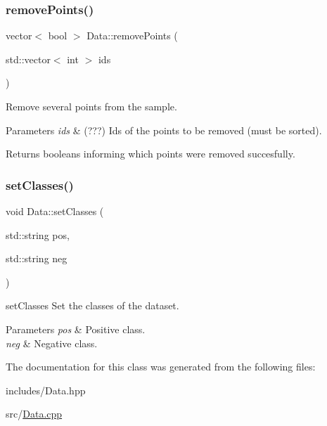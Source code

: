 \subsubsection{\texorpdfstring{remove\+Points()}{removePoints()}}
{\footnotesize\ttfamily vector$<$ bool $>$ Data\+::remove\+Points (\begin{DoxyParamCaption}\item[{std\+::vector$<$ int $>$}]{ids }\end{DoxyParamCaption})}



Remove several points from the sample. 


\begin{DoxyParams}{Parameters}
{\em ids} & (???) Ids of the points to be removed (must be sorted). \\
\hline
\end{DoxyParams}
\begin{DoxyReturn}{Returns}
booleans informing which points were removed succesfully. 
\end{DoxyReturn}
\mbox{\label{class_data_a6dd8a8a1e1659c76e5716fc8a23a86e2}} 
\subsubsection{\texorpdfstring{set\+Classes()}{setClasses()}}
{\footnotesize\ttfamily void Data\+::set\+Classes (\begin{DoxyParamCaption}\item[{std\+::string}]{pos,  }\item[{std\+::string}]{neg }\end{DoxyParamCaption})}



set\+Classes Set the classes of the dataset. 


\begin{DoxyParams}{Parameters}
{\em pos} & Positive class. \\
\hline
{\em neg} & Negative class. \\
\hline
\end{DoxyParams}


The documentation for this class was generated from the following files\+:\begin{DoxyCompactItemize}
\item 
includes/Data.\+hpp\item 
src/\hyperlink{_data_8cpp}{Data.\+cpp}\end{DoxyCompactItemize}
